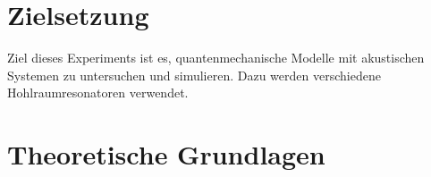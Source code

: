 \section{Zielsetzung}
Ziel dieses Experiments ist es, quantenmechanische Modelle mit akustischen Systemen zu untersuchen und simulieren.
Dazu werden verschiedene Hohlraumresonatoren verwendet.


\section{Theoretische Grundlagen}

